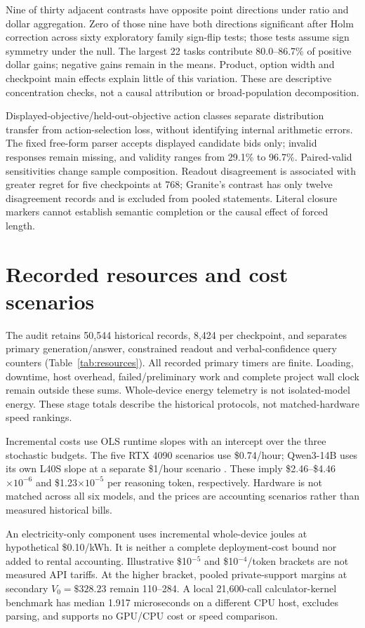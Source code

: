 \documentclass[sigconf,anonymous,nonacm]{acmart}
\begin{document}
Nine of thirty adjacent contrasts have opposite point directions under ratio and dollar aggregation. Zero of those nine have both directions significant after Holm correction across sixty exploratory family sign-flip tests; those tests assume sign symmetry under the null. The largest 22 tasks contribute 80.0--86.7\% of positive dollar gains; negative gains remain in the means. Product, option width and checkpoint main effects explain little of this variation. These are descriptive concentration checks, not a causal attribution or broad-population decomposition.

Displayed-objective/held-out-objective action classes separate distribution transfer from action-selection loss, without identifying internal arithmetic errors. The fixed free-form parser accepts displayed candidate bids only; invalid responses remain missing, and validity ranges from 29.1\% to 96.7\%. Paired-valid sensitivities change sample composition. Readout disagreement is associated with greater regret for five checkpoints at 768; Granite's contrast has only twelve disagreement records and is excluded from pooled statements. Literal closure markers cannot establish semantic completion or the causal effect of forced length.
\section{Recorded resources and cost scenarios}
The audit retains 50,544 historical records, 8,424 per checkpoint, and separates primary generation/answer, constrained readout and verbal-confidence query counters (Table~\ref{tab:resources}). All recorded primary timers are finite. Loading, downtime, host overhead, failed/preliminary work and complete project wall clock remain outside these sums. Whole-device energy telemetry is not isolated-model energy. These stage totals describe the historical protocols, not matched-hardware speed rankings.

Incremental costs use OLS runtime slopes with an intercept over the three stochastic budgets. The five RTX 4090 scenarios use \$0.74/hour; Qwen3-14B uses its own L40S slope at a separate \$1/hour scenario \citep{runpod2026pricing}. These imply \$2.46--\$4.46$\times10^{-6}$ and \$1.23$\times10^{-5}$ per reasoning token, respectively. Hardware is not matched across all six models, and the prices are accounting scenarios rather than measured historical bills.

An electricity-only component uses incremental whole-device joules at hypothetical \$0.10/kWh. It is neither a complete deployment-cost bound nor added to rental accounting. Illustrative \$10$^{-5}$ and \$10$^{-4}$/token brackets are not measured API tariffs. At the higher bracket, pooled private-support margins at secondary $V_0=\$328.23$ remain 110--284. A local 21,600-call calculator-kernel benchmark has median 1.917 microseconds on a different CPU host, excludes parsing, and supports no GPU/CPU cost or speed comparison.
\end{document}
